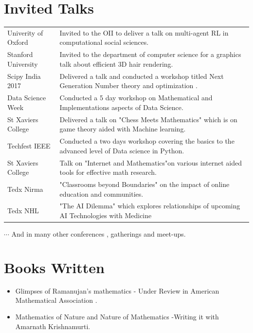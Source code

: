 \documentclass[]{deedy-resume-openfont}
\begin{document}
\section{Invited Talks}
\hline
\vspace{\topsep}
\begin{tabular}{ll}
Univerity of Oxford & Invited to the OII to deliver a talk on multi-agent RL in computational social sciences.\\
Stanford University & Invited to the department of computer science for a graphics talk about efficient 3D hair rendering. \\
Scipy India 2017 & Delivered a talk and conducted a workshop titled Next Generation Number theory and optimization .\\
Data Science Week & Conducted a 5 day workshop on Mathematical and Implementations aspects of Data Science. \\
St Xaviers College & Delivered a talk on "Chess Meets Mathematics" which is on game theory aided with Machine learning.\\
Techfest IEEE & Conducted a two days workshop covering the basics to the advanced level of Data science in Python.\\
St Xaviers College & Talk on  "Internet and Mathematics"on various internet aided tools for effective math research.\\
Tedx Nirma & "Classrooms beyond Boundaries" on the impact of online education and communities.\\
Tedx NHL & "The AI Dilemma" which explores relationships of upcoming AI Technologies with Medicine \\
\end{tabular}
$\cdots$ And in many other conferences , gatherings and meet-ups.
\sectionsep

\section{Books Written}
\hline
\vspace{\topsep}
\begin{itemize}
\item Glimpses of Ramanujan’s mathematics - Under Review in American Mathematical Association .
\item Mathematics of Nature and Nature of Mathematics -Writing it with Amarnath Krishnamurti.
\end{itemize}
\sectionsep
\end{document}
